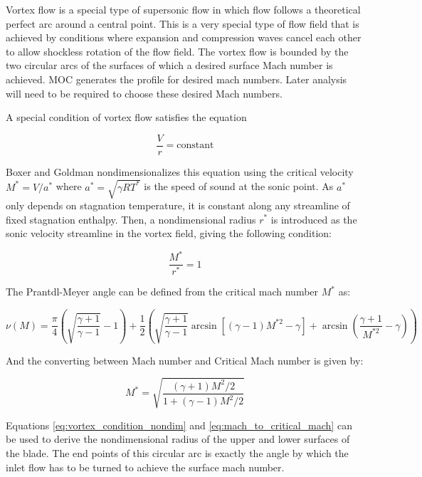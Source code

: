 Vortex flow is a special type of supersonic flow in which flow follows a theoretical perfect arc around a central point. This is a very special type of flow field that is achieved by conditions where expansion and compression waves cancel each other to allow shockless rotation of the flow field. The vortex flow is bounded by the two circular arcs of the surfaces of which a desired surface Mach number is achieved. MOC generates the profile for desired mach numbers. Later analysis will need to be required to choose these desired Mach numbers.

A special condition of vortex flow satisfies the equation

\begin{equation}
    \frac{V}{r} = \textrm{constant}
    \label{eq:vortex_condition}
\end{equation}

Boxer and Goldman nondimensionalizes this equation using the critical velocity $M^{*}=V/a^*$ where $a^*=\sqrt{\gamma R T^*}$ is the speed of sound at the sonic point. As $a^*$ only depends on stagnation temperature, it is constant along any streamline of fixed stagnation enthalpy. Then, a nondimensional radius $r^*$ is introduced as the sonic velocity streamline in the vortex field, giving the following condition:

\begin{equation}
    \frac{M^*}{r^*} = 1
    \label{eq:vortex_condition_nondim}
\end{equation}

The Prantdl-Meyer angle can be defined from the critical mach number $M^*$ as:

\begin{equation}
\nu(M) = \frac{\pi}{4}\left(\sqrt{\frac{\gamma+1}{\gamma-1}} - 1\right) + \frac{1}{2}\left(\sqrt{\frac{\gamma+1}{\gamma-1}} \arcsin\left[(\gamma-1)M^{*2} - \gamma\right] + \arcsin\left(\frac{\gamma+1}{M^{*2}} - \gamma\right)\right)
\label{eq:prandtl_meyer_angle}
\end{equation}

And the converting between Mach number and Critical Mach number is given by:

\begin{equation}
M^* = \sqrt{\frac{(\gamma+1)M^2/2}{1 + (\gamma-1)M^2/2}}
\label{eq:mach_to_critical_mach}
\end{equation}

Equations \cref{eq:vortex_condition_nondim} and \cref{eq:mach_to_critical_mach} can be used to derive the nondimensional radius of the upper and lower surfaces of the blade. The end points of this circular arc is exactly the angle by which the inlet flow has to be turned to achieve the surface mach number. 

